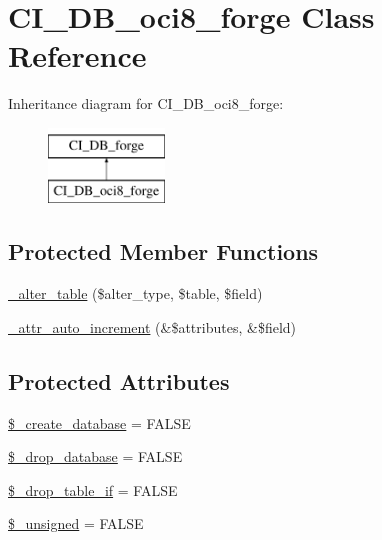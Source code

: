 \hypertarget{class_c_i___d_b__oci8__forge}{}\section{C\+I\+\_\+\+D\+B\+\_\+oci8\+\_\+forge Class Reference}
\label{class_c_i___d_b__oci8__forge}
Inheritance diagram for C\+I\+\_\+\+D\+B\+\_\+oci8\+\_\+forge\+:\begin{figure}[H]
\begin{center}
\leavevmode
\includegraphics[height=2.000000cm]{class_c_i___d_b__oci8__forge}
\end{center}
\end{figure}
\subsection*{Protected Member Functions}
\begin{DoxyCompactItemize}
\item 
\hyperlink{class_c_i___d_b__oci8__forge_a41c6cae02f2fda8b429ad0afb9509426}{\+\_\+alter\+\_\+table} (\$alter\+\_\+type, \$table, \$field)
\item 
\hyperlink{class_c_i___d_b__oci8__forge_a2a013a5932439c3c44f0dad3436525f7}{\+\_\+attr\+\_\+auto\+\_\+increment} (\&\$attributes, \&\$field)
\end{DoxyCompactItemize}
\subsection*{Protected Attributes}
\begin{DoxyCompactItemize}
\item 
\hyperlink{class_c_i___d_b__oci8__forge_acd23c9a8735806155f1a5d0a87c151f2}{\$\+\_\+create\+\_\+database} = F\+A\+L\+S\+E
\item 
\hyperlink{class_c_i___d_b__oci8__forge_a8305b12fc17f6f87778260ebdff287b4}{\$\+\_\+drop\+\_\+database} = F\+A\+L\+S\+E
\item 
\hyperlink{class_c_i___d_b__oci8__forge_a92a8a9145a7fc91e252e58d019373581}{\$\+\_\+drop\+\_\+table\+\_\+if} = F\+A\+L\+S\+E
\item 
\hyperlink{class_c_i___d_b__oci8__forge_aae977ae6d61fa183f0b25422b6ddc31c}{\$\+\_\+unsigned} = F\+A\+L\+S\+E
\end{DoxyCompactItemize}
